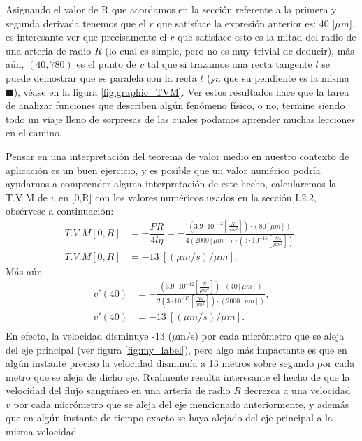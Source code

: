 Asignando el valor de R que acordamos en la sección referente a la primera y segunda derivada tenemos que el $r$ que satisface la expresión anterior es: 40 [$\mu m$], es interesante ver que precisamente el $r$ que satisface esto es la mitad del radio de una arteria de radio $R$ (lo cual es simple, pero no es muy trivial de deducir), más aún, $(40,780)$ es el punto de $v$ tal que si trazamos una recta tangente $l$ se puede demostrar que es paralela con la recta $t$ (ya que su pendiente es la misma $\blacksquare$), véase en la figura \ref{fig:graphic_TVM}. Ver estos resultados hace que la tarea de analizar funciones que describen algún fenómeno físico, o no, termine siendo todo un viaje lleno de sorpresas de las cuales podamos aprender muchas lecciones en el camino.

Pensar en una interpretación del teorema de valor medio en nuestro contexto de aplicación es un buen ejercicio, y es posible que un valor numérico podría ayudarnos a comprender alguna interpretación de este hecho, calcularemos la T.V.M de $v$ en [0,R] con los valores numéricos usados en la sección I.2.2, obsérvese a continuación:
\begin{align*}
    T.V.M[0,R]&=-\dfrac{PR}{4l\eta}=-\frac{\left(3.9 \cdot 10^{-12}\left[\frac{N}{\mu m^2}\right]\right)\cdot\left(80\left[\mu m\right]\right)}{4\left(2000\left[\mu m\right]\right)\cdot\left(3\cdot10^{-15}\left[\frac{Ns}{\mu m^2}\right]\right)},\\
    T.V.M[0,R]&=-13\ [(\mu m/s)/\mu m].
\end{align*}
Más aún
\begin{align*}
    v'(40)&=-\frac{\left(3.9 \cdot 10^{-12}\left[\frac{N}{\mu m^2}\right]\right)\cdot\left(40 [\mu m]\right)}{2\left(3\cdot10^{-15}\left[\frac{Ns}{\mu m^2}\right]\right)\cdot\left(2000\left[\mu m\right]\right)},\\
    v'(40)&=-13\ [(\mu m/s)/\mu m].\\
\end{align*}
En efecto, la velocidad disminuye -13 ($\mu$m/s) por cada micrómetro que se aleja del eje principal (ver figura \ref{fig:my_label}), pero algo más impactante es que en algún instante preciso la velocidad disminuía a 13 metros sobre segundo por cada metro que se aleja de dicho eje. Realmente resulta interesante el hecho de que la velocidad del flujo sanguíneo en una arteria de radio $R$ decrezca a una velocidad $v$ por cada micrómetro que se aleja del eje mencionado anteriormente, y además que en algún instante de tiempo exacto se haya alejado del eje principal a la misma velocidad.
\\

